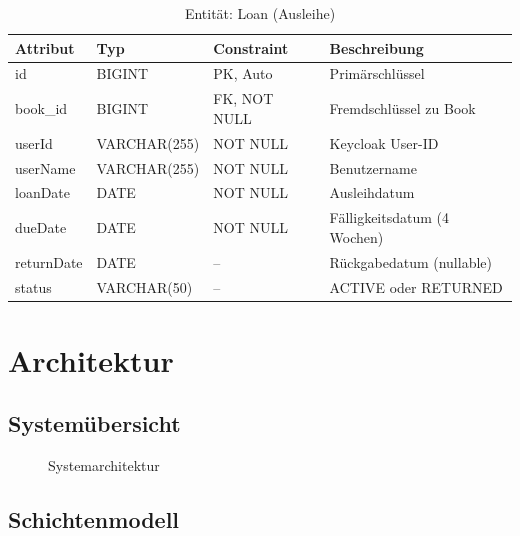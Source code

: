\documentclass[a4paper,12pt,twoside]{report}
\begin{document}
\begin{table}[H]
\centering
\caption{Entität: Loan (Ausleihe)}
\begin{tabularx}{\textwidth}{l l l X}
\toprule
\textbf{Attribut} & \textbf{Typ} & \textbf{Constraint} & \textbf{Beschreibung} \\
\midrule
id & BIGINT & PK, Auto & Primärschlüssel \\
book\_id & BIGINT & FK, NOT NULL & Fremdschlüssel zu Book \\
userId & VARCHAR(255) & NOT NULL & Keycloak User-ID \\
userName & VARCHAR(255) & NOT NULL & Benutzername \\
loanDate & DATE & NOT NULL & Ausleihdatum \\
dueDate & DATE & NOT NULL & Fälligkeitsdatum (4 Wochen) \\
returnDate & DATE & -- & Rückgabedatum (nullable) \\
status & VARCHAR(50) & -- & ACTIVE oder RETURNED \\
\bottomrule
\end{tabularx}
\end{table}

\newpage

\section{Architektur}

\subsection{Systemübersicht}

\begin{figure}[H]
\centering
{}
\caption{Systemarchitektur}
\label{fig:architektur}
\end{figure}

\subsection{Schichtenmodell}
\end{document}
